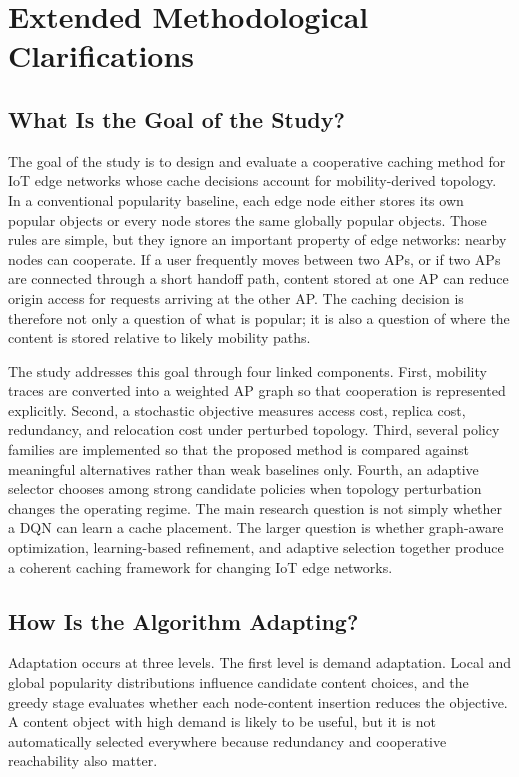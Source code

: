 \section{Extended Methodological Clarifications}

\subsection{What Is the Goal of the Study?}

The goal of the study is to design and evaluate a cooperative caching method for IoT edge networks whose cache decisions account for mobility-derived topology. In a conventional popularity baseline, each edge node either stores its own popular objects or every node stores the same globally popular objects. Those rules are simple, but they ignore an important property of edge networks: nearby nodes can cooperate. If a user frequently moves between two APs, or if two APs are connected through a short handoff path, content stored at one AP can reduce origin access for requests arriving at the other AP. The caching decision is therefore not only a question of what is popular; it is also a question of where the content is stored relative to likely mobility paths.

The study addresses this goal through four linked components. First, mobility traces are converted into a weighted AP graph so that cooperation is represented explicitly. Second, a stochastic objective measures access cost, replica cost, redundancy, and relocation cost under perturbed topology. Third, several policy families are implemented so that the proposed method is compared against meaningful alternatives rather than weak baselines only. Fourth, an adaptive selector chooses among strong candidate policies when topology perturbation changes the operating regime. The main research question is not simply whether a DQN can learn a cache placement. The larger question is whether graph-aware optimization, learning-based refinement, and adaptive selection together produce a coherent caching framework for changing IoT edge networks.

\subsection{How Is the Algorithm Adapting?}

Adaptation occurs at three levels. The first level is demand adaptation. Local and global popularity distributions influence candidate content choices, and the greedy stage evaluates whether each node-content insertion reduces the objective. A content object with high demand is likely to be useful, but it is not automatically selected everywhere because redundancy and cooperative reachability also matter.

